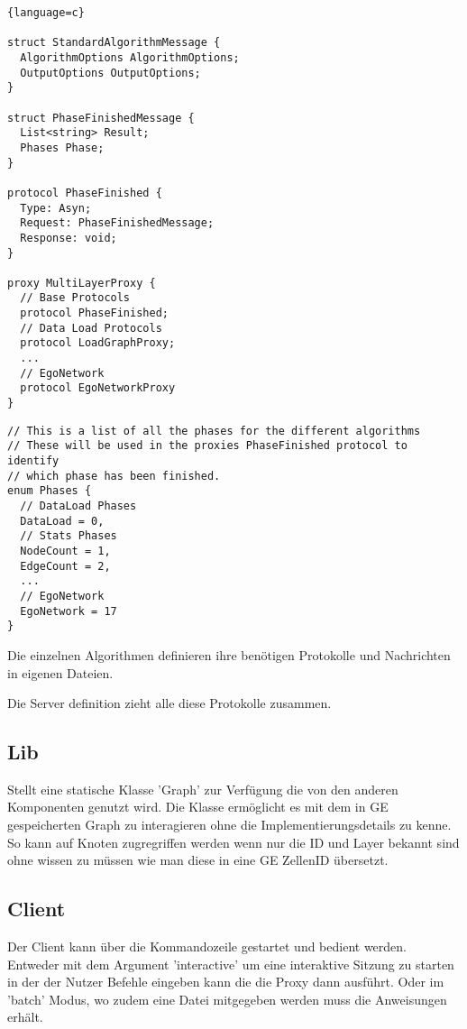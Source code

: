 \begin{lstlisting}{language=c}

struct StandardAlgorithmMessage {
  AlgorithmOptions AlgorithmOptions;
  OutputOptions OutputOptions;
}

struct PhaseFinishedMessage {
  List<string> Result;
  Phases Phase;
}

protocol PhaseFinished {
  Type: Asyn;
  Request: PhaseFinishedMessage;
  Response: void;
}

proxy MultiLayerProxy {
  // Base Protocols
  protocol PhaseFinished;
  // Data Load Protocols
  protocol LoadGraphProxy;
  ...
  // EgoNetwork
  protocol EgoNetworkProxy
}
\end{lstlisting}


\begin{lstlisting}
// This is a list of all the phases for the different algorithms
// These will be used in the proxies PhaseFinished protocol to identify
// which phase has been finished.
enum Phases {
  // DataLoad Phases
  DataLoad = 0,
  // Stats Phases
  NodeCount = 1,
  EdgeCount = 2,
  ...
  // EgoNetwork
  EgoNetwork = 17
}
\end{lstlisting}


Die einzelnen Algorithmen definieren ihre benötigen Protokolle und Nachrichten in eigenen Dateien. 

Die Server definition zieht alle diese Protokolle zusammen. 


\subsection{Lib}


Stellt eine statische Klasse 'Graph' zur Verfügung die von den anderen Komponenten genutzt wird. Die Klasse ermöglicht es mit dem in GE gespeicherten Graph zu interagieren ohne die Implementierungsdetails zu kenne. So kann auf Knoten zugregriffen werden wenn nur die ID und Layer bekannt sind ohne wissen zu müssen wie man diese in eine GE ZellenID übersetzt.



\subsection{Client}

Der Client kann über die Kommandozeile gestartet und bedient werden. Entweder mit dem Argument 'interactive' um eine interaktive Sitzung zu starten
in der der Nutzer Befehle eingeben kann die die Proxy dann ausführt. Oder im 'batch' Modus, wo zudem eine Datei mitgegeben werden muss die Anweisungen erhält.

